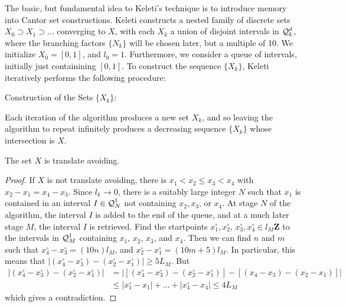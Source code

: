 The basic, but fundamental idea to Keleti's technique is to introduce memory into Cantor set constructions. Keleti constructs a nested family of discrete sets $X_0 \supset X_1 \supset \dots$ converging to $X$, with each $X_k$ a union of disjoint intervals in $\operatorname{\mathcal{Q}}_k^d$, where the branching factors $\{ N_k \}$ will be chosen later, but a multiple of 10. We initialize $X_0 = [0,1]$, and $l_0 = 1$. Furthermore, we consider a queue of intervals, initially just containining $[0,1]$. To construct the sequence $\{ X_k \}$, Keleti iteratively performs the following procedure:
%
\begin{algorithm}[H]
    \begin{algorithmic}%
        \caption{Construction of the Sets $\{ X_k \}$:}
        \MRepeat


            \EndForAll
        \EndRepeat   
    \end{algorithmic}
\end{algorithm}

Each iteration of the algorithm produces a new set $X_k$, and so leaving the algorithm to repeat infinitely produces a decreasing sequence $\{ X_k \}$ whose intersection is $X$.

\begin{lemma}
    The set $X$ is translate avoiding.
\end{lemma}
\begin{proof}
    If $X$ is not translate avoiding, there is $x_1 < x_2 \leq x_3 < x_4$ with $x_2 - x_1 = x_4 - x_3$. Since $l_k \to 0$, there is a suitably large integer $N$ such that $x_1$ is contained in an interval $I \in \operatorname{\mathcal{Q}}_N^1$ not containing $x_2,x_3$, or $x_4$. At stage $N$ of the algorithm, the interval $I$ is added to the end of the queue, and at a much later stage $M$, the interval $I$ is retrieved. Find the startpoints $x_1^\circ, x_2^\circ$, $x_3^\circ, x_4^\circ \in l_M \mathbf{Z}$ to the intervals in $\operatorname{\mathcal{Q}}_M^1$ containing $x_1$, $x_2$, $x_3$, and $x_4$. Then we can find $n$ and $m$ such that $x_4^\circ - x_3^\circ = (10n)l_M$, and $x_2^\circ - x_1^\circ = (10m + 5)l_M$. In particular, this means that $|(x_4^\circ - x_3^\circ) - (x_2^\circ - x_1^\circ)| \geq 5L_M$. But
    \begin{align*}
        |(x_4^\circ - x_3^\circ) - (x_2^\circ - x_1^\circ)| &= |[(x_4^\circ - x_3^\circ) - (x_2^\circ - x_1^\circ)] - [(x_4 - x_3) - (x_2 - x_1)]|\\
        &\leq |x_1^\circ - x_1| + \dots + |x_4^\circ - x_4| \leq 4 L_M
    \end{align*}
    which gives a contradiction.
\end{proof}

